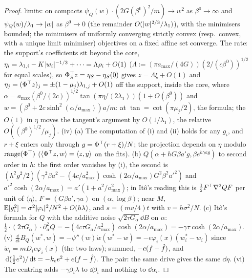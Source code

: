 \begin{proof}
limits: on compacts $\psi_Q(w)\cdot(2G(\beta^0)^2/m)\to w^2$ as $\beta^0\to\infty$ and $\psi_Q(w)/\lambda_1\to\lvert w\rvert$
as $\beta^0\to0$ (the remainder $O(\lvert w\rvert^{2/3}/\lambda_1)$), with the minimisers bounded; the minimisers of uniformly
converging strictly convex (resp.\ convex, with a unique limit minimiser) objectives on a fixed affine set converge. The
rate: the support's coefficients sit beyond the core,
$\eta_i = \lambda_{1,i} - K\lvert w_i\rvert^{-1/3} + \dots = \Lambda\rho_i + O(1)$
($\Lambda := (\pi a_{\max}/(4G))(2/(c\beta^0))^{1/2}$ for equal scales), so $\Phi_S^\top z = \eta_S - \eta_S(0)$ gives
$z = \Lambda\xi + O(1)$ and $\eta_j = (\Phi^\top z)_j = \pm(1 - \mu_j)\lambda_{1,j} + O(1)$ off the support, inside the
core, where $\alpha = a_{\max}(\beta^0/(2c))^{1/2}\tan(\pi\eta/(2\lambda_1))(1 + O(\beta^0))$ and
$w = (\beta^0 + 2c\sinh^2(\alpha/a_{\max}))a/m$: at $\tan = \cot(\pi\mu_j/2)$, the formula; the $O(1)$ in $\eta$ moves
the tangent's argument by $O(1/\lambda_1)$, the relative $O((\beta^0)^{1/2}/\mu_j)$. (iv) (a) The computation of (i)
and (ii) holds for any $g_i$, and $r + \xi$ enters only through $g = \Phi^\top(r + \xi)/N$; the projection depends on
$\eta$ modulo $\operatorname{range}(\Phi^\top)$ ($\langle\Phi^\top z,w\rangle = \langle z,y\rangle$ on the fits). (b)
$Q(\alpha + hG\beta a'g,\beta e^{h\gamma ag})$ to second order in $h$: the first order vanishes by (i), the second is
$(h^2g^2/2)(\gamma^2\beta a^2 - (4c/a_{\max}^2)\cosh(2\alpha/a_{\max})G^2\beta^2a'^2)$ and
$a'^2\cosh(2\alpha/a_{\max}) = a'(1 + a^2/a_{\max}^2)$; in It\^o's reading this is $\tfrac12F^\top\nabla^2QF$ per unit of
$\langle\eta\rangle$, $F = (G\beta a',\gamma a)$ on $(\alpha,\log\beta)$; near $M$,
$\mathbb{E}[g_i^2] = \sigma^2\lvert \varphi_i\rvert^2/N^2 + O(h\lambda)$, and $s = (mv/4)t$ with $v = h\sigma^2/N$. (c) It\^o's formula
for $Q$ with the additive noise $\sqrt{2\tau G_\alpha}\dd B$ on $\alpha$:
$\tfrac12\cdot(2\tau G_\alpha)\cdot\partial^2_\alpha Q = -(4c\tau G_\alpha/a_{\max}^2)\cosh(2\alpha/a_{\max})
= -\gamma\tau\cosh(2\alpha/a_{\max})$. (v)
$\frac{\dd}{\dd t}B_Q(w^*,w) = -\psi''(w)\dot w(w^* - w) = -e\varphi_i(x)(w^*_i - w_i)$ since
$\dot w_i = mD_ie\varphi_i(x)$ (the two laws); summed, $-e(f - \hat f)$, and
$\,\mathrm{d}(\tfrac12e^2)/\,\mathrm{d} t = -k_ee^2 + e(f - \hat f)$. The pair: the same drive gives the same $\dd\eta$. (vi) The centring
adds $-\gamma\beta_i\lambda$ to $\dd\beta_i$ and nothing to $\dd\alpha_i$.
\end{proof}
